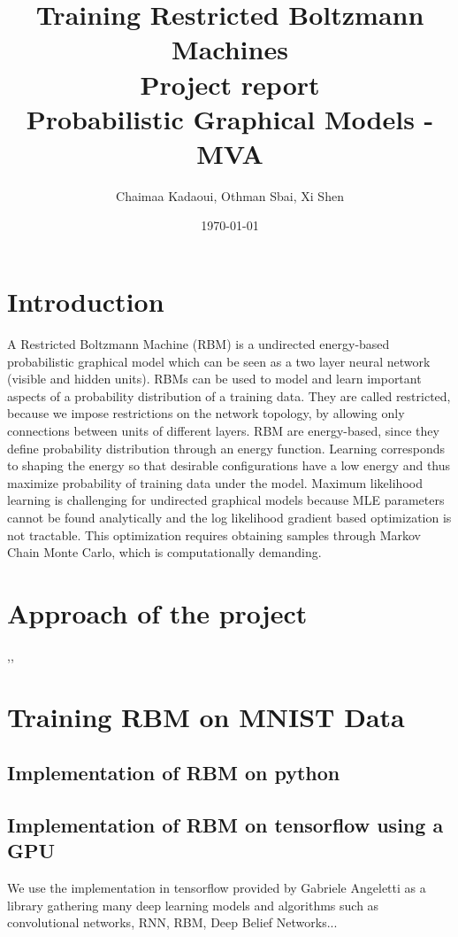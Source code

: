 \documentclass[a4paper,10pt]{article}
\title{%
	\huge{Training Restricted Boltzmann Machines}\\ \bigbreak
  	\Large{Project report}\\ 
  	\Large{Probabilistic Graphical Models - MVA}
}
\author{Chaimaa Kadaoui, Othman Sbai, Xi Shen}
\date\today
\begin{document}
\maketitle

\section{Introduction}

A Restricted Boltzmann Machine (RBM) is a undirected energy-based probabilistic graphical model which can be seen as a two layer neural network (visible and hidden units). RBMs can be used to model and learn important aspects of a probability distribution of a training data. They are called restricted, because we impose restrictions on the network topology, by allowing only connections between units of different layers. RBM are energy-based, since they define probability distribution through an energy function. Learning corresponds to shaping the energy so that desirable configurations have a low energy and thus maximize probability of training data under the model. Maximum likelihood learning is challenging for undirected graphical models because MLE parameters cannot be found analytically and the log likelihood gradient based optimization is not tractable. This optimization requires obtaining samples through Markov Chain Monte Carlo, which is computationally demanding.


\section{Approach of the project}

\cite{hinton2010practical},\cite{tieleman2008training},\cite{fischer2014training}


\section{Training RBM on MNIST Data}

\subsection{Implementation of RBM on python}

\subsection{Implementation of RBM on tensorflow using a GPU}

We use the implementation in tensorflow provided by Gabriele Angeletti as a library gathering many deep learning models and algorithms such as convolutional networks, RNN, RBM, Deep Belief Networks...






\end{document}
